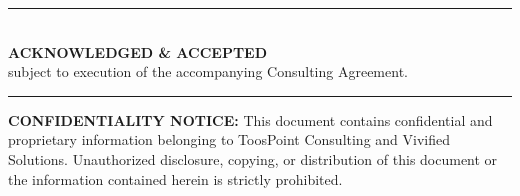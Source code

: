 \documentclass{toospoint}
\begin{document}
\vspace{20pt}

\begin{center}
  {\color{TPBorder}\rule{0.7\textwidth}{0.5pt}}\\[6pt]
  {\sffamily\bfseries\color{TPDark}ACKNOWLEDGED \& ACCEPTED}\\[4pt]
  {\sffamily\small\color{TPGray}subject to execution of the accompanying Consulting Agreement.}\\[6pt]
  {\color{TPBorder}\rule{0.7\textwidth}{0.5pt}}
\end{center}

\vspace{16pt}

\noindent
{}
\hfill
{}

\vspace{28pt}

\begin{mdframed}[
  linecolor=TPBorder,
  linewidth=1pt,
  roundcorner=4pt,
  backgroundcolor=TPLight,
  innerleftmargin=14pt,
  innerrightmargin=14pt,
  innertopmargin=10pt,
  innerbottommargin=10pt
]
\sffamily\footnotesize\color{TPGray}
\textbf{CONFIDENTIALITY NOTICE:} This document contains confidential and
proprietary information belonging to ToosPoint Consulting and Vivified
Solutions. Unauthorized disclosure, copying, or distribution of this document
or the information contained herein is strictly prohibited.
\end{mdframed}
\end{document}
